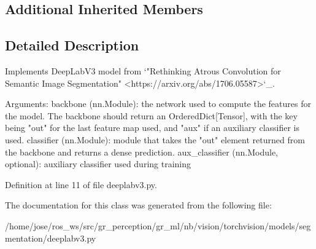 \subsection*{Additional Inherited Members}


\subsection{Detailed Description}
\begin{DoxyVerb}Implements DeepLabV3 model from
`"Rethinking Atrous Convolution for Semantic Image Segmentation"
<https://arxiv.org/abs/1706.05587>`_.

Arguments:
    backbone (nn.Module): the network used to compute the features for the model.
        The backbone should return an OrderedDict[Tensor], with the key being
        "out" for the last feature map used, and "aux" if an auxiliary classifier
        is used.
    classifier (nn.Module): module that takes the "out" element returned from
        the backbone and returns a dense prediction.
    aux_classifier (nn.Module, optional): auxiliary classifier used during training
\end{DoxyVerb}
 

Definition at line 11 of file deeplabv3.\+py.



The documentation for this class was generated from the following file\+:\begin{DoxyCompactItemize}
\item 
/home/jose/ros\+\_\+ws/src/gr\+\_\+perception/gr\+\_\+ml/nb/vision/torchvision/models/segmentation/deeplabv3.\+py\end{DoxyCompactItemize}

